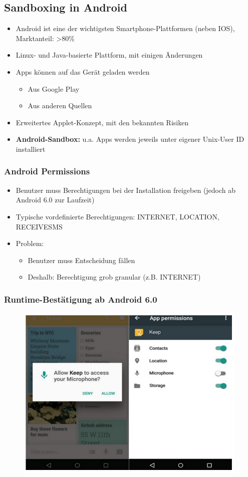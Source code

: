 \documentclass[openany]{book}
\begin{document}
\subsection{Sandboxing in Android}

\begin{itemize}
    \item Android ist eine der wichtigsten Smartphone-Plattformen (neben IOS), Marktanteil: >80\%
    \item Linux- und Java-basierte Plattform, mit einigen Änderungen
    \item Apps können auf das Gerät geladen werden
    \begin{itemize}
        \item Aus Google Play
        \item Aus anderen Quellen
    \end{itemize}
    \item Erweitertes Applet-Konzept, mit den bekannten Risiken
    \item \textbf{Android-Sandbox:} u.a. Apps werden jeweils unter eigener Unix-User ID installiert
\end{itemize}

\subsubsection{Android Permissions}

\begin{itemize}
    \item Benutzer muss Berechtigungen bei der Installation freigeben (jedoch ab Android 6.0 zur Laufzeit)
    \item Typische vordefinierte Berechtigungen: INTERNET, LOCATION, RECEIVE\textunderscore SMS
    \item Problem:
    \begin{itemize}
        \item Benutzer muss Entscheidung fällen
        \item Deshalb: Berechtigung grob granular (z.B. INTERNET)
    \end{itemize}
\end{itemize}

\subsubsection{Runtime-Bestätigung ab Android 6.0}

\begin{figure}[h!]
    \centering
    \includegraphics[width=0.6\linewidth]{Pics/AndroidPermission.PNG}
\end{figure}
\end{document}
